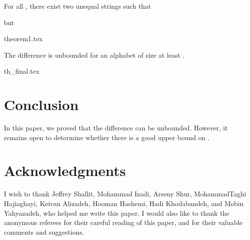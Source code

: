 \documentclass[preprint, 12pt]{elsarticle}
\begin{document}
	
	\begin{theorem}
		\label{th:main}
		For all , there exist two unequal strings  such that 
		
		but 
		 
	\end{theorem}
	{theorem1.tex}
	
	
	
	\begin{theorem}
		\label{th:final}
		The difference 
		 is unbounded for an alphabet of size at least . 
	\end{theorem}
	{th_final.tex}



	\section{Conclusion}
	In this paper, we proved that the difference  can be unbounded. However, it remains open to determine whether there is a good upper bound on .

	\section*{Acknowledgments}
I wish to thank Jeffrey Shallit, Mohammad Izadi, Arseny Shur, MohammadTaghi Hajiaghayi, Keivan Alizadeh, Hooman Hashemi, Hadi Khodabandeh, and Mobin Yahyazadeh, who helped me write this paper. I would also like to thank the anonymous referees for their careful reading of this paper, and for their valuable comments and suggestions. 
	
\end{document}
